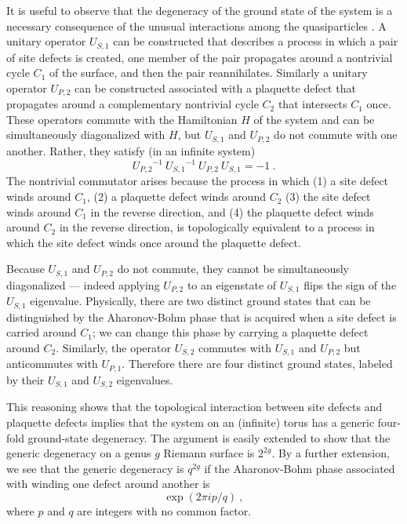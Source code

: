 It is useful to observe that the degeneracy of the ground state of the system is a necessary consequence of the unusual interactions among the quasiparticles \cite{einarsson,wen}. A unitary operator $U_{S,1}$ can be constructed that describes a process in which a pair of site defects is created, one member of the pair propagates around a nontrivial cycle $C_1$ of the surface, and then the pair reannihilates. Similarly a unitary operator $U_{P,2}$ can be constructed associated with a plaquette defect that propagates around a complementary nontrivial cycle $C_2$ that intersects $C_1$ once. These operators commute with the Hamiltonian $H$ of the system and can be simultaneously diagonalized with $H$, but $U_{S,1}$ and $U_{P,2}$ do not commute with one another. Rather, they satisfy (in an infinite system)
\begin{equation}
   {U_{P,2}}^{-1} ~ {U_{S,1}}^{-1}~U_{P,2}~U_{S,1}= -1 ~.
\end{equation}
The nontrivial commutator arises because the process in which (1) a site defect winds around $C_1$, (2) a plaquette defect winds around $C_2$ (3) the site defect winds around $C_1$ in the reverse direction, and (4) the plaquette defect winds around $C_2$ in the reverse direction, is topologically equivalent to a process in which the site defect winds once around the plaquette defect.

Because $U_{S,1}$ and $U_{P,2}$ do not commute, they cannot be simultaneously diagonalized --- indeed applying $U_{P,2}$ to an eigenstate of $U_{S,1}$ flips the sign of the $U_{S,1}$ eigenvalue. Physically, there are two distinct ground states that can be distinguished by the Aharonov-Bohm phase that is acquired when a site defect is carried around $C_1$; we can change this phase by carrying a plaquette defect around $C_2$.  Similarly, the operator $U_{S,2}$ commutes with $U_{S,1}$ and $U_{P,2}$ but anticommutes with $U_{P,1}$. Therefore there are four distinct ground states, labeled by their $U_{S,1}$ and $U_{S,2}$ eigenvalues.

This reasoning shows that the topological interaction between site defects and plaquette defects implies that the system on an (infinite) torus has a generic four-fold ground-state degeneracy. The argument is easily extended to show that the generic degeneracy on a genus $g$ Riemann surface is $2^{2g}$. By a further extension, we see that the generic degeneracy is $q^{2g}$ if the Aharonov-Bohm phase associated with winding one defect around another is 
\begin{equation}
\exp (2\pi ip/q)~,
\end{equation}
where $p$ and $q$ are integers with no common factor.

